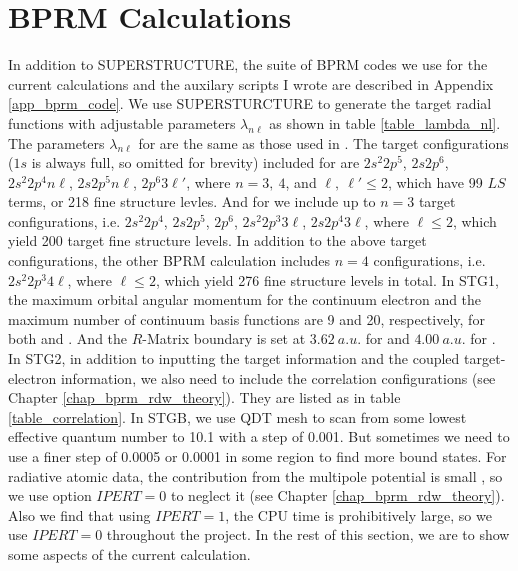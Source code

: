 \section{BPRM Calculations}
In addition to SUPERSTRUCTURE, the suite of BPRM codes we use for the current calculations and the auxilary scripts I wrote are described in Appendix \ref{app_bprm_code}. We use SUPERSTURCTURE to generate the target radial functions with adjustable parameters $\lambda_{n\ell}$ as shown in table \ref{table_lambda_nl}. The parameters $\lambda_{n\ell}$ for  are the same as those used in \citet{guoxin_benchmark}. The target configurations ($1s$ is always full, so omitted for brevity) included for  are ${2s^2 2p^5}$, ${2s 2p^6}$, ${2s^2 2p^4 n\ell}$, ${2s 2p^5 n\ell}$, ${2p^6 3\ell'}$, where $n=3, ~4$, and $\ell,~ \ell'\leq2$, which have 99 $LS$ terms, or 218 fine structure levles. And for  we include up to $n=3$ target configurations, i.e. $2s^2 2p^4$, $2s 2p^5$, $2p^6$, $2s^2 2p^3 3\ell$, $2s 2p^4 3\ell$, where $\ell\leq2$, which yield 200 target fine structure levels. In addition to the above target configurations,  the other BPRM calculation includes $n=4$ configurations, i.e. $2s^2 2p^3 4\ell$, where $\ell\leq2$, which yield 276 fine structure levels in total. In STG1, the maximum orbital angular momentum for the continuum electron and the maximum number of continuum basis functions are 9 and 20, respectively, for both  and . And the $R$-Matrix boundary is set at $3.62~ a.u.$ for  and $4.00~ a.u.$ for . In STG2, in addition to inputting the target information and the coupled target-electron information, we also need to include the correlation configurations (see Chapter \ref{chap_bprm_rdw_theory}). They are listed as in table \ref{table_correlation}. In STGB, we use QDT mesh to scan from some lowest effective quantum number to 10.1 with a step of 0.001. But sometimes we need to use a finer step of 0.0005 or 0.0001 in some region to find more bound states. For radiative atomic data, the contribution from the multipole potential is small \citep{opcd_2}, so we use option $IPERT = 0$ to neglect it (see Chapter \ref{chap_bprm_rdw_theory}). Also we find that using $IPERT=1$, the CPU time is prohibitively large, so we use $IPERT=0$ throughout the project. In the rest of this section, we are to show some aspects of the current calculation.

